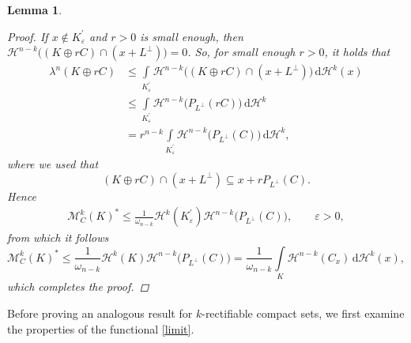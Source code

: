\documentclass[pdflatex,sn-mathphys-num]{sn-jnl}
\theoremstyle{plain}
\newtheorem{lemma}[theorem]{Lemma}
\theoremstyle{definition}
\newcommand{\dH}[1]{\,\mathrm d\mathcal{H}^{#1}}
\begin{document}
\begin{lemma}
\begin{proof}
            If $x\notin K_{\varepsilon}^{\prime}$ and $r>0$ is small enough, then $\mathcal{H}^{n-k}\big((K\oplus rC)\cap (x+L^{\perp})\big)=0$. So, for small enough $r>0$, it holds that \begin{equation*}
                \begin{split}
                    \lambda^n(K\oplus rC)&\leq\int\limits_{K_{\varepsilon}^{\prime}}\mathcal{H}^{n-k}\big((K\oplus rC)\cap (x+L^{\perp})\big)\dH{k}(x)\\&\leq\int\limits_{K_{\varepsilon}^{\prime}}\mathcal{H}^{n-k}\big(P_{L^{\perp}}(rC)\big)\dH{k}\\&=r^{n-k}\int\limits_{K^{\prime}_{\varepsilon}}\mathcal{H}^{n-k}\big(P_{L^{\perp}}(C)\big)\dH{k},
                \end{split}
            \end{equation*} where we used that $$(K\oplus rC)\cap (x+L^{\perp})\subseteq x+rP_{L^{\perp}}(C).$$ Hence \begin{equation*}
                \begin{split}
                    \mathcal{M}^k_C(K)^*\leq\frac{1}{\omega_{n-k}}\mathcal{H}^k(K^{\prime}_\varepsilon)\mathcal{H}^{n-k}\big(P_{L^{\perp}}(C)\big), \qquad\varepsilon>0,
                \end{split}
            \end{equation*}from which it follows $$\mathcal{M}^k_C(K)^*\leq\frac{1}{\omega_{n-k}}\mathcal{H}^k(K)\mathcal{H}^{n-k}\big(P_{L^{\perp}}(C)\big)=\frac{1}{\omega_{n-k}}\int\limits_{K}\mathcal{H}^{n-k}(C_x)\dH{k}(x),$$ which completes the proof.
        \end{proof}
\end{lemma}

Before proving an analogous result for $k$-rectifiable compact sets, we first examine the properties of the functional \eqref{limit}.
\end{document}
